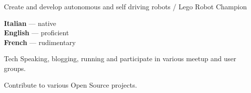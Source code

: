 \documentclass[9pt]{developercv}
\begin{document}


\begin{entrylist}
		{Create and develop autonomous and self driving robots / Lego Robot Champion}
		{}
		{}
\end{entrylist}


\begin{minipage}[t]{0.3\textwidth}
	\vspace{-\baselineskip}


	\textbf{Italian} --- native\\
	\textbf{English} --- proficient\\
	\textbf{French} --- rudimentary
\end{minipage}
\hfill
\begin{minipage}[t]{0.3\textwidth}
	\vspace{-\baselineskip}


	Tech Speaking, blogging, running and participate in various meetup and user groups.
\end{minipage}
\hfill
\begin{minipage}[t]{0.3\textwidth}
	\vspace{-\baselineskip}


	Contribute to various Open Source projects.
\end{minipage}

\end{document}
